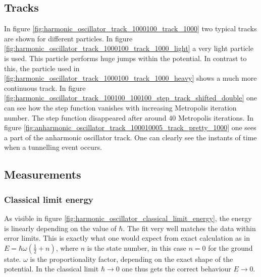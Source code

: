 \documentclass{scrartcl}
\begin{document}
	\subsection{Tracks}
		In figure \ref{fig:harmonic_oscillator_track_1000100_track_1000} two typical tracks are shown for different particles.
		In figure \ref{fig:harmonic_oscillator_track_1000100_track_1000_light} a very light particle is used.
		This particle performs huge jumps within the potential.
		In contrast to this, the particle used in \ref{fig:harmonic_oscillator_track_1000100_track_1000_heavy} shows a much more continuous track.
		In figure \ref{fig:harmonic_oscillator_track_100100_100100_step_track_shifted_double} one can see how the step function vanishes with increasing Metropolis iteration number.
		The step function disappeared after around 40 Metropolis iterations.
		In figure \ref{fig:anharmonic_oscillator_track_100010005_track_pretty_1000} one sees a part of the anharmonic oscillator track.
		One can clearly see the instants of time when a tunnelling event occurs.

	\subsection{Measurements}
	\subsubsection{Classical limit energy}
		As visible in figure \ref{fig:harmonic_oscillator_classical_limit_energy}, the energy is linearly depending on the value of $\hbar$.
		The fit very well matches the data within error limits.
		This is exactly what one would expect from exact calculation as in $E = \hbar \omega \left(\frac 12 + n\right)$, where $n$ is the state number, in this case $n = 0$ for the ground state.
		$\omega$ is the proportionality factor, depending on the exact shape of the potential.
		In the classical limit $\hbar \rightarrow 0$ one thus gets the correct behaviour $E \rightarrow 0$.
\end{document}
